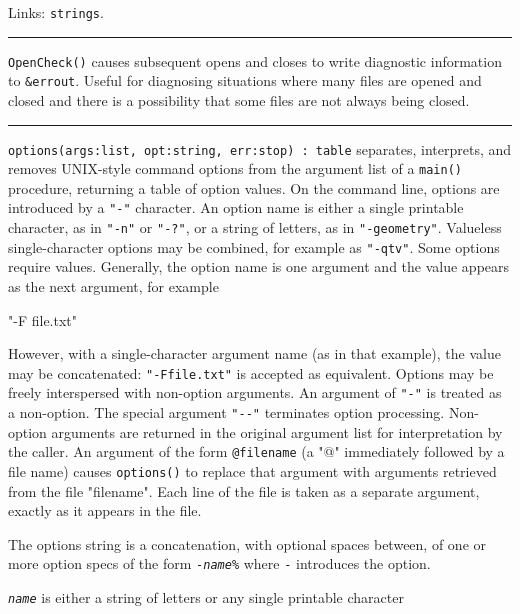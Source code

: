 Links: \texttt{strings}.

\vspace{0.25cm}\hrule{}

\texttt{OpenCheck()} causes subsequent opens and closes to write
diagnostic information to \texttt{\&errout}. Useful for diagnosing
situations where many files are opened and closed and there is a
possibility that some files are not always being closed.

\vspace{0.25cm}\hrule{}

\texttt{options(args:list, opt:string, err:stop) : table} separates,
interprets, and removes UNIX-style command
options from the argument list of a \texttt{main()} procedure,
returning a table of option values. On the command line, options are
introduced by a \texttt{"-"} character. An
option name is either a single printable character, as in
\texttt{"-n"} or
\texttt{"-?"}, or a string of letters, as
in \texttt{"-geometry"}. Valueless
single-character options may be combined, for example as
\texttt{"-qtv"}. Some options require
values. Generally, the option name is one argument and the value
appears as the next argument, for example

{\ttfamily
"-F file.txt"}

However, with a single-character argument name (as in that example), the
value may be concatenated:
\texttt{"-Ffile.txt"} is accepted as
equivalent. Options may be freely interspersed with non-option
arguments. An argument of \texttt{"-"} is
treated as a non-option. The special argument
\texttt{"-{}-"} terminates option
processing. Non-option arguments are returned in the original argument
list for interpretation by the caller. An argument of the form
\texttt{@filename} (a "@" immediately
followed by a file name) causes \texttt{options()} to replace that
argument with arguments retrieved from the file
"filename". Each line of the file is taken
as a separate argument, exactly as it appears in the file.

The options string is a concatenation, with optional spaces between, of
one or more option specs of the form
\texttt{{}-}\texttt{\textit{name}}\texttt{\%} where \texttt{{}-}
introduces the option.

\texttt{\textit{name}} is either a string of letters or any single
printable character

